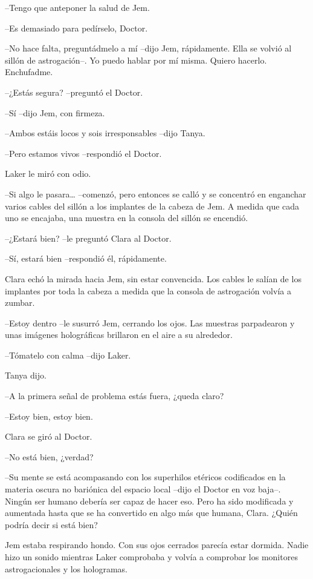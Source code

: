 {--Tengo que anteponer la salud de Jem.}

{--Es demasiado para pedírselo, Doctor.}

{--No hace falta, preguntádmelo a mí --dijo Jem, rápidamente. Ella se
 volvió al sillón de astrogación--. Yo puedo hablar por mí misma. Quiero
hacerlo. Enchufadme.}

{--¿Estás segura? --preguntó el Doctor.}

{--Sí --dijo Jem, con firmeza.}

{--Ambos estáis locos y sois irresponsables --dijo Tanya.}

{--Pero estamos vivos --respondió el Doctor.}

{Laker le miró con odio.}

{--Si algo le pasara\ldots{} --comenzó, pero entonces se calló y se
 concentró en enganchar varios cables del sillón a los implantes de la
 cabeza de Jem. A medida que cada uno se encajaba, una muestra en la
consola del sillón se encendió.}

{--¿Estará bien? --le preguntó Clara al Doctor.}

{--Sí, estará bien --respondió él, rápidamente.}

{Clara echó la mirada hacia Jem, sin estar convencida. Los cables le
 salían de los implantes por toda la cabeza a medida que la consola de
astrogación volvía a zumbar.}

{--Estoy dentro --le susurró Jem, cerrando los ojos. Las muestras
 parpadearon y unas imágenes holográficas brillaron en el aire a su
alrededor.}

{--Tómatelo con calma --dijo Laker.}

{Tanya dijo.}

{--A la primera señal de problema estás fuera, ¿queda claro?}

{--Estoy bien, estoy bien.}

{Clara se giró al Doctor.}

{--No está bien, ¿verdad?}

{--Su mente se está acompasando con los superhilos etéricos codificados
 en la materia oscura no bariónica del espacio local --dijo el Doctor en
 voz baja--. Ningún ser humano debería ser capaz de hacer eso. Pero ha
 sido modificada y aumentada hasta que se ha convertido en algo más que
humana, Clara. ¿Quién podría decir si está bien?}

{Jem estaba respirando hondo. Con sus ojos cerrados parecía estar
 dormida. Nadie hizo un sonido mientras Laker comprobaba y volvía a
comprobar los monitores astrogacionales y los hologramas.}

